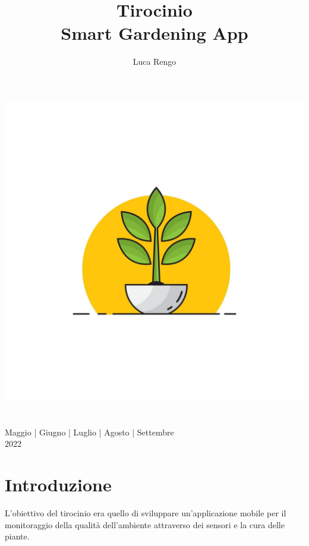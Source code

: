 \documentclass[a4paper,12pt]{report}
\title{\textbf{Tirocinio} \\[1.5ex] Smart Gardening App}
\author{Luca Rengo}
\begin{document}
	
\makeatletter
\begin{titlepage}
	\begin{center}
		\includegraphics[width=0.7\linewidth]{images/logo/plant-icon.png}\\
		{\Huge  \@title }\\[3ex] 
		{\large  \@author}\\[3ex] 
		{\large Maggio | Giugno | Luglio | Agosto | Settembre}\\[3ex]
		{\large 2022}\\[3ex]
	\end{center}
\end{titlepage}
\makeatother
\thispagestyle{empty}
\newpage
	

\tableofcontents

\newpage


	
	
\section{Introduzione}

\textsf{\small L'obiettivo del tirocinio era quello di sviluppare un'applicazione mobile per il monitoraggio della qualità dell'ambiente attraverso dei sensori e la cura delle piante.}
\end{document}

